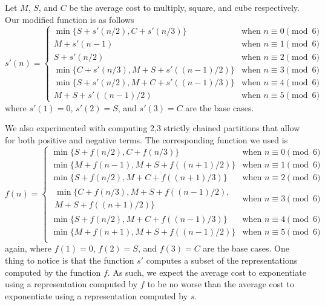 \documentclass{ucalgthes1}
\theoremstyle{definition}
\begin{document}
Let $M$, $S$, and $C$ be the average cost to multiply, square, and cube respectively. Our modified function is as follows
\begin{equation*}
s'(n) = \begin{cases}
	\min\{S + s'(n/2), C + s'(n/3)\} & \textrm{when } n \equiv 0 \pmod 6 \\
	M + s'(n-1) & \textrm{when } n \equiv 1 \pmod 6 \\
	S + s'(n/2) & \textrm{when } n \equiv 2 \pmod 6 \\
	\min\{C + s'(n/3), M + S + s'((n-1)/2)\} & \textrm{when } n \equiv 3 \pmod 6 \\
	\min\{S + s'(n/2), M + C + s'((n-1)/3)\} & \textrm{when } n \equiv 4 \pmod 6 \\
	M + S + s'((n-1)/2) & \textrm{when } n \equiv 5 \pmod 6
\end{cases}
\end{equation*}
where $s'(1) = 0$, $s'(2) = S$, and $s'(3) = C$ are the base cases.

We also experimented with computing 2,3 strictly chained partitions that allow for both positive and negative terms.  The corresponding function we used is
\begin{equation*}
f(n) = \begin{cases}
	\min\{S + f(n/2), C + f(n/3)\} & \textrm{when } n \equiv 0 \pmod 6 \\
	\min\{M + f(n-1), M + S + f((n+1)/2)\} & \textrm{when } n \equiv 1 \pmod 6 \\
	\min\{S + f(n/2), M + C + f((n+1)/3)\} & \textrm{when } n \equiv 2 \pmod 6 \\
	\begin{split}\min\{C + f(n/3), M + S + f((n-1)/2),\\M + S + f((n+1)/2)\}\end{split} & \textrm{when } n \equiv 3 \pmod 6 \\
	\min\{S + f(n/2), M + C + f((n-1)/3)\} & \textrm{when } n \equiv 4 \pmod 6 \\
	\min\{M + f(n+1), M + S + f((n-1)/2)\} & \textrm{when } n \equiv 5 \pmod 6 \\
\end{cases}
\end{equation*}
again, where $f(1) = 0$, $f(2) = S$, and $f(3) = C$ are the base cases.  One thing to notice is that the function $s'$ computes a subset of the representations computed by the function $f$.  As such, we expect the average cost to exponentiate using a representation computed by $f$ to be no worse than the average cost to exponentiate using a representation computed by $s$.
\end{document}

